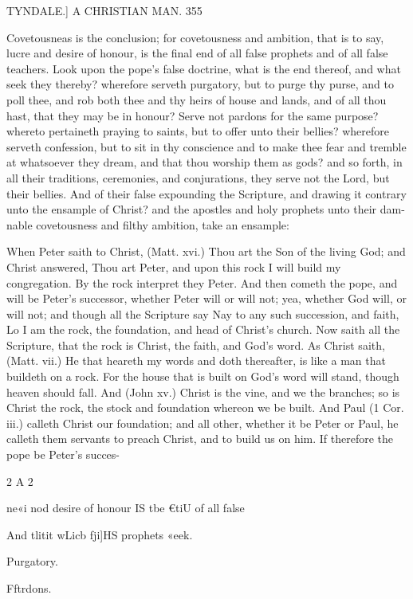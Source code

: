 \documentclass{custom}
\begin{document}
{TYNDALE.]
A CHRISTIAN MAN.
355

Covetousneas is the conclusion; for covetousness and 
ambition, that is to say, lucre and desire of honour, is the 
final end of all false prophets and of all false teachers. 
Look upon the pope's false doctrine, what is the end 
thereof, and what seek they thereby? wherefore serveth 
purgatory, but to purge thy purse, and to poll thee, and 
rob both thee and thy heirs of house and lands, and of all 
thou hast, that they may be in honour? Serve not pardons 
for the same purpose? whereto pertaineth praying to 
saints, but to offer unto their bellies? wherefore serveth 
confession, but to sit in thy conscience and to make thee 
fear and tremble at whatsoever they dream, and that thou 
worship them as gods? and so forth, in all their traditions, 
ceremonies, and conjurations, they serve not the Lord, 
but their bellies. And of their false expounding the 
Scripture, and drawing it contrary unto the ensample of 
Christ? and the apostles and holy prophets unto their dam- 
nable covetousness and filthy ambition, take an ensample: 

When Peter saith to Christ, (Matt. xvi.) Thou art the 
Son of the living God; and Christ answered, Thou art 
Peter, and upon this rock I will build my congregation. 
By the rock interpret they Peter. And then cometh the 
pope, and will be Peter's successor, whether Peter will 
or will not; yea, whether God will, or will not; and though 
all the Scripture say Nay to any such succession, and faith, 
Lo I am the rock, the foundation, and head of Christ's 
church. Now saith all the Scripture, that the rock is 
Christ, the faith, and God's word. As Christ saith, 
(Matt. vii.) He that heareth my words and doth thereafter, 
is like a man that buildeth on a rock. For the house that 
is built on God's word will stand, though heaven should 
fall. And (John xv.) Christ is the vine, and we the 
branches; so is Christ the rock, the stock and foundation 
whereon we be built. And Paul (1 Cor. iii.) calleth 
Christ our foundation; and all other, whether it be Peter 
or Paul, he calleth them servants to preach Christ, and to 
build us on him. If therefore the pope be Peter's succes- 

2 A 2 

ne«i nod 
desire of 
honour IS 
tbe €tiU of 
all false 

And tlitit 
wLicb fji]HS 
prophets 
«eek. 

Purgatory. 

Fftrdons. 

}
\end{document}
